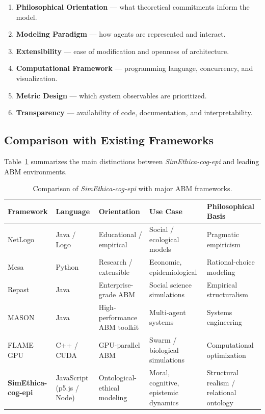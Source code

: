 \documentclass[11pt]{article}
\begin{document}
\begin{enumerate}
  \item \textbf{Philosophical Orientation} — what theoretical commitments inform the model.
  \item \textbf{Modeling Paradigm} — how agents are represented and interact.
  \item \textbf{Extensibility} — ease of modification and openness of architecture.
  \item \textbf{Computational Framework} — programming language, concurrency, and visualization.
  \item \textbf{Metric Design} — which system observables are prioritized.
  \item \textbf{Transparency} — availability of code, documentation, and interpretability.
\end{enumerate}

\subsection{Comparison with Existing Frameworks}

Table~\ref{tab:comparison} summarizes the main distinctions between \textit{SimEthica-cog-epi} and leading ABM environments.

\begin{table}[H]
\centering
\begin{tabular}{@{}lllll@{}}
\toprule
\textbf{Framework} & \textbf{Language} & \textbf{Orientation} & \textbf{Use Case} & \textbf{Philosophical Basis} \\
\midrule
NetLogo & Java / Logo & Educational / empirical & Social / ecological models & Pragmatic empiricism \\
Mesa & Python & Research / extensible & Economic, epidemiological & Rational-choice modeling \\
Repast & Java & Enterprise-grade ABM & Social science simulations & Empirical structuralism \\
MASON & Java & High-performance ABM toolkit & Multi-agent systems & Systems engineering \\
FLAME GPU & C++ / CUDA & GPU-parallel ABM & Swarm / biological simulations & Computational optimization \\
\textbf{SimEthica-cog-epi} & JavaScript (p5.js / Node) & Ontological-ethical modeling & Moral, cognitive, epistemic dynamics & Structural realism / relational ontology \\
\bottomrule
\end{tabular}
\caption{Comparison of \textit{SimEthica-cog-epi} with major ABM frameworks.}
\label{tab:comparison}
\end{table}
\end{document}
